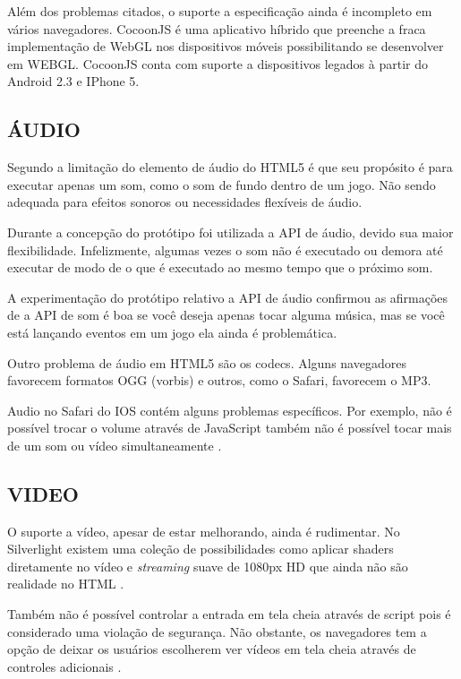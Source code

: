 Além dos problemas citados, o suporte a especificação ainda é
incompleto em vários navegadores. CocoonJS é uma aplicativo híbrido
que preenche a fraca implementação de WebGL nos dispositivos móveis
possibilitando se desenvolver em WEBGL. CocoonJS conta com suporte a
dispositivos legados à partir do Android 2.3 e IPhone 5.

\subsection{ÁUDIO}

Segundo \citet{html5mostwanted} a limitação do elemento de áudio do
HTML5 é que seu propósito é para executar apenas um som, como o som
de fundo dentro de um jogo. Não sendo adequada para efeitos sonoros 
ou necessidades flexíveis de áudio.

Durante a concepção do protótipo foi utilizada a API de áudio, devido
sua maior flexibilidade. Infelizmente, algumas vezes o som não é
executado ou demora até executar de modo de o que é executado ao mesmo
tempo que o próximo som.

A experimentação do protótipo relativo a API de áudio confirmou as
afirmações de \citet{html5mostwanted} a API de som é boa se você
deseja apenas tocar alguma música, mas se você está lançando eventos
em um jogo ela ainda é problemática.

Outro problema de áudio em HTML5 são os codecs. Alguns navegadores
favorecem formatos OGG (vorbis) e outros, como o Safari, favorecem o
MP3.

Audio no Safari do IOS contém alguns problemas específicos.
Por exemplo, não é possível trocar o volume através de
JavaScript também não é possível tocar mais de um som ou vídeo
simultaneamente \autocite{unsolvedMediaHtmlIssues}.

\subsection{VIDEO}

O suporte a vídeo, apesar de estar melhorando, ainda é rudimentar. No
Silverlight existem uma coleção de possibilidades como aplicar shaders
diretamente no vídeo e \textit{streaming} suave de 1080px HD que ainda
não são realidade no HTML \autocite[p. 8]{researchOnHtml}.

Também não é possível controlar a entrada em tela cheia através de script
pois é considerado uma violação de segurança. Não obstante,
os navegadores tem a opção de deixar os usuários escolherem ver
vídeos em tela cheia através de controles adicionais \autocite[p.
68]{proHtml5}.

